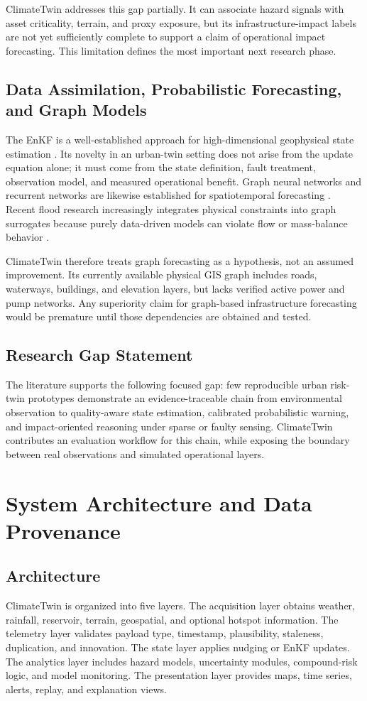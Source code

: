 \documentclass[journal]{IEEEtran}
\begin{document}
ClimateTwin addresses this gap partially. It can associate hazard signals with asset criticality, terrain, and proxy exposure, but its infrastructure-impact labels are not yet sufficiently complete to support a claim of operational impact forecasting. This limitation defines the most important next research phase.

\subsection{Data Assimilation, Probabilistic Forecasting, and Graph Models}
The EnKF is a well-established approach for high-dimensional geophysical state estimation \cite{evensen2003,houtekamer2016}. Its novelty in an urban-twin setting does not arise from the update equation alone; it must come from the state definition, fault treatment, observation model, and measured operational benefit. Graph neural networks and recurrent networks are likewise established for spatiotemporal forecasting \cite{kipf2017,seo2018}. Recent flood research increasingly integrates physical constraints into graph surrogates because purely data-driven models can violate flow or mass-balance behavior \cite{hydrograph2025}.

ClimateTwin therefore treats graph forecasting as a hypothesis, not an assumed improvement. Its currently available physical GIS graph includes roads, waterways, buildings, and elevation layers, but lacks verified active power and pump networks. Any superiority claim for graph-based infrastructure forecasting would be premature until those dependencies are obtained and tested.

\subsection{Research Gap Statement}
The literature supports the following focused gap: few reproducible urban risk-twin prototypes demonstrate an evidence-traceable chain from environmental observation to quality-aware state estimation, calibrated probabilistic warning, and impact-oriented reasoning under sparse or faulty sensing. ClimateTwin contributes an evaluation workflow for this chain, while exposing the boundary between real observations and simulated operational layers.

\section{System Architecture and Data Provenance}
\subsection{Architecture}
ClimateTwin is organized into five layers. The acquisition layer obtains weather, rainfall, reservoir, terrain, geospatial, and optional hotspot information. The telemetry layer validates payload type, timestamp, plausibility, staleness, duplication, and innovation. The state layer applies nudging or EnKF updates. The analytics layer includes hazard models, uncertainty modules, compound-risk logic, and model monitoring. The presentation layer provides maps, time series, alerts, replay, and explanation views.
\end{document}

